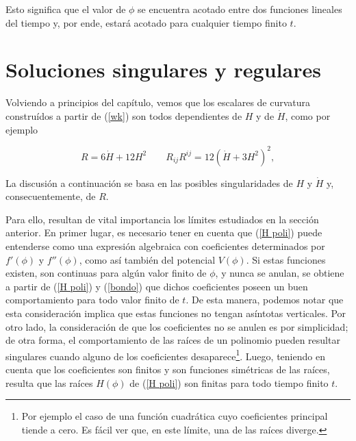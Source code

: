 Esto significa que el valor de $\phi$ se encuentra acotado entre dos funciones lineales del tiempo y, por ende, estará acotado para cualquier tiempo finito $t$.








    
\section{Soluciones singulares y regulares} 


Volviendo a principios del capítulo, vemos que los escalares de curvatura construídos a partir de (\ref{wk}) son todos dependientes de $H$ y de $\dot{H}$, como por ejemplo

$$
R=6\dot{H} + 12H^2 \qquad R_{ij}R^{ij}=12 \left(\dot{H}+ 3H^2\right)^2,
$$


La discusión a continuación se basa en las posibles singularidades de $H$ y $\dot{H}$ y, consecuentemente, de $R$.



Para ello, resultan de vital importancia los límites estudiados en la sección anterior. En primer lugar, es necesario tener en cuenta que (\ref{H poli}) puede entenderse como una expresión algebraica con coeficientes determinados por $f'(\phi)$ y $f''(\phi)$, como así también del potencial $V(\phi)$. Si estas funciones existen, son continuas para algún valor finito de $\phi$, y nunca se anulan, se obtiene a partir de (\ref{H poli}) y (\ref{bondo}) que dichos coeficientes poseen un buen comportamiento para todo valor finito de $t$. De esta manera, podemos notar que esta consideración implica que estas funciones no tengan asíntotas verticales. Por otro lado, la consideración de que los coeficientes no se anulen es por simplicidad; de otra forma, el comportamiento de las raíces de un polinomio pueden resultar singulares cuando alguno de los coeficientes desaparece\footnote{Por ejemplo el caso de una función cuadrática cuyo coeficientes principal tiende a cero. Es fácil ver que, en este límite, una de las raíces diverge.}. Luego, teniendo en cuenta que los coeficientes son finitos y son funciones simétricas de las raíces, resulta que las raíces $H(\phi)$ de (\ref{H poli}) son finitas para todo tiempo finito $t$.

